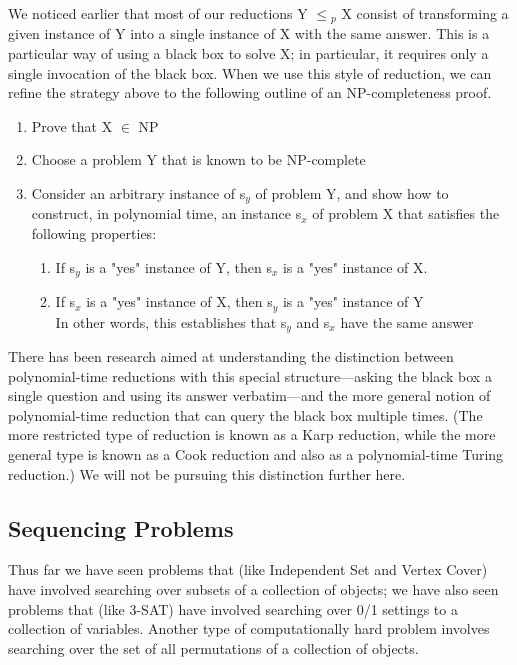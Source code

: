\documentclass{article}
\begin{document}
We noticed earlier that most of our reductions Y $\le$$_p$ X consist of transforming a given instance of Y into a single instance of X with the same answer. This is a particular way of using a black box to solve X; in particular, it requires only a single invocation of the black box. When we use this style of reduction, we can refine the strategy above to the following outline of an NP-completeness proof.\\

\begin{enumerate}
    \item Prove that X $\in$ NP
    \item Choose a problem Y that is known to be NP-complete
    \item Consider an arbitrary instance of s$_y$ of problem Y, and show how to construct, in polynomial time, an instance s$_x$ of problem X that satisfies the following properties:
    \begin{enumerate}
        \item If s$_y$ is a "yes" instance of Y, then s$_x$ is a "yes" instance of X.
        \item If s$_x$ is a "yes" instance of X, then s$_y$ is a "yes" instance of Y\\
        In other words, this establishes that s$_y$ and s$_x$ have the same answer
    \end{enumerate}
\end{enumerate}

There has been research aimed at understanding the distinction between polynomial-time reductions with this special structure—asking the black box a single question and using its answer verbatim—and the more general notion of polynomial-time reduction that can query the black box multiple times. (The more restricted type of reduction is known as a Karp reduction, while the more general type is known as a Cook reduction and also as a polynomial-time Turing reduction.) We will not be pursuing this distinction further here.

\subsection{Sequencing Problems}
Thus far we have seen problems that (like Independent Set and Vertex Cover) have involved searching over subsets of a collection of objects; we have also seen problems that (like 3-SAT) have involved searching over 0/1 settings to a collection of variables. Another type of computationally hard problem involves searching over the set of all permutations of a collection of objects.\\
\end{document}
